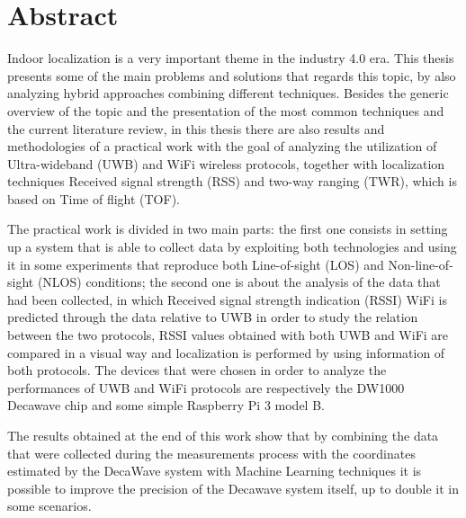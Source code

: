 
\begingroup
\let\clearpage\relax
\let\cleardoublepage\relax
\let\cleardoublepage\relax

\chapter*{Abstract}

Indoor localization is a very important theme in the industry 4.0 era.
This thesis presents some of the main problems and solutions that regards this
topic, by also analyzing hybrid approaches combining different techniques.
Besides the generic overview of the topic and the presentation of the most common techniques
and the current literature review, in this thesis there are also results and methodologies of a
practical work with the goal of analyzing the utilization of Ultra-wideband (UWB) and WiFi
wireless protocols, together with localization techniques Received
signal strength (RSS) and two-way ranging (TWR), which is based on Time of flight (TOF).

The practical work is divided in two main parts: the first one consists in setting up a
system that is able to collect data by exploiting both technologies and using it in
some experiments that reproduce both Line-of-sight (LOS) and Non-line-of-sight (NLOS) conditions; the
second one is about the analysis of the data that had been collected, in
which Received signal strength indication (RSSI) WiFi is predicted through the data relative to UWB in order to study
the relation between the two protocols, RSSI values obtained with both UWB and
WiFi are compared in a visual way and localization is performed by using
information of both protocols.
The devices that were chosen in order to analyze the performances of UWB and
WiFi protocols are respectively the DW1000 Decawave chip and some simple
Raspberry Pi 3 model B.

The results obtained at the end of this work show that by combining the data that
were collected during the measurements process with the coordinates estimated by
the DecaWave system with Machine Learning techniques it is possible to improve
the precision of the Decawave system itself, up to double it in some scenarios.


\vfill
\newpage
{}
